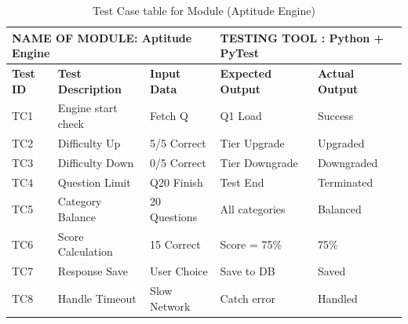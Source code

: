 \begin{table}[htbp]
\begin{center}
\caption{Test Case table for Module (Aptitude Engine)}
 \begin{tabular}{| m{1cm} | m{4cm} | m{2 cm}| m{3cm}|m{3cm}| } 
\hline
\multicolumn{3}{|l|}{NAME OF MODULE: Aptitude Engine}&
\multicolumn{2}{|l|}{TESTING TOOL : Python + PyTest}\\[0.8cm]
\hline
\textbf{Test ID} &\textbf{Test Description} & \textbf{Input Data} & \textbf{Expected Output} & \textbf{Actual Output} \\ 
\hline
TC1 & Engine start check & Fetch Q & Q1 Load & Success \\[1.25cm]
\hline
TC2 & Difficulty Up & 5/5 Correct & Tier Upgrade & Upgraded \\[1.25cm]
\hline
TC3 & Difficulty Down & 0/5 Correct & Tier Downgrade & Downgraded \\[1.25cm]
\hline
TC4 & Question Limit & Q20 Finish & Test End & Terminated \\[1.25cm]
\hline
TC5 & Category Balance & 20 Questions & All categories & Balanced \\[1.25cm]
\hline
TC6 & Score Calculation & 15 Correct & Score = 75\% & 75\% \\[1.25cm]
\hline
TC7 & Response Save & User Choice & Save to DB & Saved \\[1.25cm]
\hline
TC8 & Handle Timeout & Slow Network & Catch error & Handled \\[1.25cm]
\hline
\end{tabular}

\end{center}
\end{table}
\clearpage
